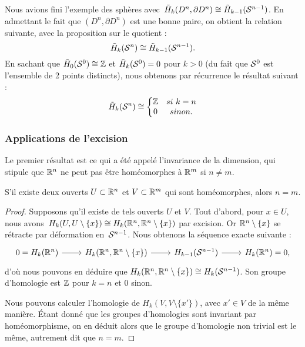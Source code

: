 \begin{exemple}
Nous avions fini l'exemple des sphères avec~${\Tilde{H}_k(D^n,\partial D^n)\cong \Tilde{H}_{k-1}(\mathcal{S}^{n-1})}$. En admettant le fait que $(D^n,\partial D^n)$ est une bonne paire, on obtient la relation suivante, avec la proposition sur le quotient : \[\Tilde{H}_k(\mathcal{S}^{n})\cong \Tilde{H}_{k-1}(\mathcal{S}^{n-1}).\]En sachant que $\Tilde{H}_0(\mathcal{S}^{0})\cong\mathbb{Z}$ et $\Tilde{H}_k(\mathcal{S}^{0})=0$ pour $k>0$ (du fait que $\mathcal{S}^{0}$ est l'ensemble de 2 points distincts), nous obtenons par récurrence le résultat suivant : \[ \Tilde{H}_k(\mathcal{S}^{n})\cong\left\{\begin{matrix}
\mathbb{Z}&si\ k=n\\
0&sinon.
\end{matrix}\right.\]
\end{exemple}

\subsubsection{Applications de l'excision}

Le premier résultat est ce qui a été appelé l'invariance de la dimension, qui stipule que $\mathbb{R}^n$ ne peut pas être homéomorphes à $\mathbb{R}^m$ si $n\neq m$.

\begin{theorem}
S'il existe deux ouverts $U\subset\mathbb{R}^n$ et $V\subset\mathbb{R}^m$ qui sont homéomorphes, alors $n=m$.
\end{theorem}
\begin{proof}
Supposons qu'il existe de tels ouverts $U$ et $V$. Tout d'abord, pour $x\in U$, nous avons~${H_k(U,U\setminus\{x\})\cong H_k(\mathbb{R}^n,\mathbb{R}^n\setminus\{x\})}$ par excision. Or $\mathbb{R}^n\setminus\{x\}$ se rétracte par déformation en~$\mathcal{S}^{n-1}$. Nous obtenons la séquence exacte suivante : \[\begin{tikzcd}
0=H_k(\bb{R}^n)\arrow[r]&H_k(\bb{R}^n,\bb{R}^n\setminus\{x\})\arrow[r] &H_{k-1}(\s{n-1})\arrow[r]&H_k(\bb{R}^n)=0,
\end{tikzcd}\]d'où nous pouvons en déduire que $H_k(\mathbb{R}^n,\mathbb{R}^n\setminus\{x\})\cong H_k(\mathcal{S}^{n-1})$. Son groupe d'homologie est $\mathbb{Z}$ pour $k=n$ et 0 sinon.

Nous pouvons calculer l'homologie de $H_k(V,V\setminus\{x'\})$, avec $x'\in V$ de la même manière. Étant donné que les groupes d'homologies sont invariant par homéomorphisme, on en déduit alors que le groupe d'homologie non trivial est le même, autrement dit que $n=m$.
\end{proof}

